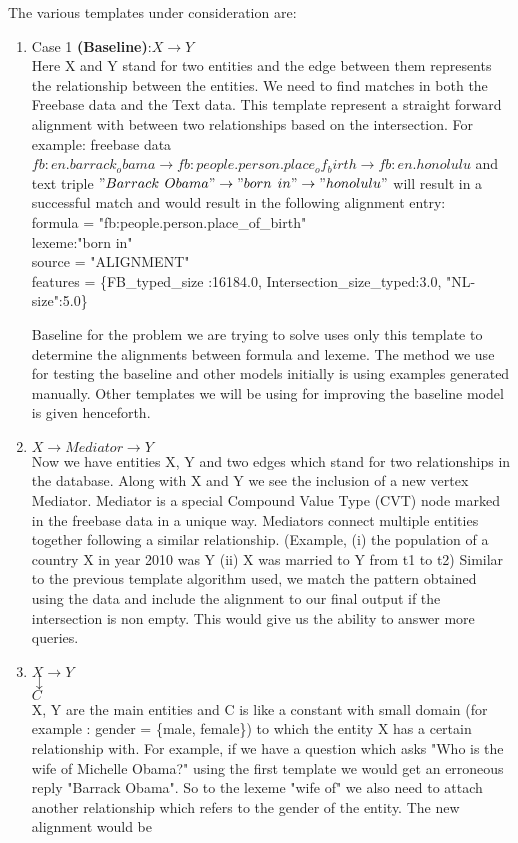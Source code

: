 \documentclass[12pt, a4paper]{article}
\begin{document}
The various templates under consideration are:
\begin{enumerate}
	\item Case 1 {\bf (Baseline)}:$X\rightarrow Y$\\
	Here X and Y stand for two entities and the edge between them represents the relationship between the entities. We need to find matches in both the Freebase data and the Text data. This template represent a straight forward alignment with between two relationships based on the intersection. For example: freebase data $fb:en.barrack_obama \rightarrow	fb:people.person.place_of_birth \rightarrow	fb:en.honolulu$ and text triple $"Barrack$ $Obama" \rightarrow "born$ $in" \rightarrow "honolulu"$ will result in a successful match and would result in the following alignment entry:\\
	
formula = "fb:people.person.place\_of\_birth"\\
lexeme:"born in"\\
source = "ALIGNMENT"\\
features = \{FB\_typed\_size :16184.0, Intersection\_size\_typed:3.0, "NL-size":5.0\}

Baseline for the problem we are trying to solve uses only this template to determine the alignments between formula and lexeme. The method we use for testing the baseline and other models initially is using examples generated manually. Other templates we will be using for improving the baseline model is given henceforth.

 
	\item $X\rightarrow Mediator \rightarrow Y$\\
	Now we have entities X, Y and two edges which stand for two relationships in the database. Along with X and Y we see the inclusion of a new vertex Mediator. Mediator is a special Compound Value Type (CVT) node marked in the freebase data in a unique way. Mediators connect multiple entities together following a similar relationship. (Example, (i) the population of a country X in year 2010 was Y (ii) X was married to Y from t1 to t2) Similar to the previous template algorithm used, we match the pattern obtained using the data and include the alignment to our final output if the intersection is non empty. This would give us the ability to answer more queries. 
	
	\item $X\rightarrow Y$\\
	 $\downarrow$\\
	 $C$\\
	X, Y are the main entities and C is like a constant with small domain (for example : gender = \{male, female\}) to which the entity X has a certain relationship with. For example, if we have a question which asks "Who is the wife of Michelle Obama?" using the first template we would get an erroneous reply "Barrack Obama". So to the lexeme "wife of" we also need to attach another relationship which refers to the gender of the entity. The new alignment would be\\
	

\end{enumerate}
\end{document}
